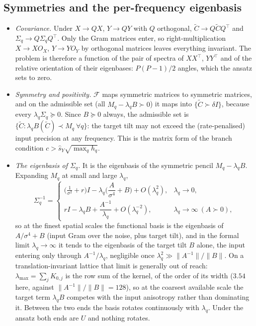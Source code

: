 \documentclass[11pt,a4paper]{article}
\newcommand{\Ct}{\tilde C}
\begin{document}
\subsection{Symmetries and the per-frequency eigenbasis}
\begin{itemize}
  \item \emph{Covariance.} Under $X \to QX$, $Y \to QY$ with $Q$ orthogonal, $\Ct \to Q\Ct Q^\top$ and $\Sigma_q \to Q\Sigma_q Q^\top$. Only the Gram matrices enter, so right-multiplication $X \to X O_X$, $Y \to Y O_Y$ by orthogonal matrices leaves everything invariant. The problem is therefore a function of the pair of spectra of $XX^\top$, $YY^\top$ and of the relative orientation of their eigenbases: $P(P-1)/2$ angles, which the ansatz sets to zero.
  \item \emph{Symmetry and positivity.} $\mathcal F$ maps symmetric matrices to symmetric matrices, and on the admissible set (all $M_q - \lambda_q B \succ 0$) it maps into $\{\Ct \succ \delta I\}$, because every $\lambda_q\Sigma_q \succeq 0$. Since $B \succeq 0$ always, the admissible set is $\{\Ct : \lambda_q B(\Ct) \prec M_q\ \forall q\}$: the target tilt may not exceed the (rate-penalised) input precision at any frequency. This is the matrix form of the branch condition $c > \hat s_Y\sqrt{\max_q h_q}$.
  \item \emph{The eigenbasis of $\Sigma_q$.} It is the eigenbasis of the symmetric pencil $M_q - \lambda_q B$. Expanding $M_q$ at small and large $\lambda_q$,
  \begin{equation}
    \Sigma_q^{-1} =
    \begin{cases}
      \big(\tfrac1{\sigma^2} + r\big) I - \lambda_q\Big(\dfrac{A}{\sigma^4} + B\Big) + O(\lambda_q^2), & \lambda_q \to 0,\\[2ex]
      r I - \lambda_q B + \dfrac{A^{-1}}{\lambda_q} + O(\lambda_q^{-2}), & \lambda_q \to \infty\ (A \succ 0),
    \end{cases}
    \label{eq:limits}
  \end{equation}
  so at the finest spatial scales the functional basis is the eigenbasis of $A/\sigma^4 + B$ (input Gram over the noise, plus target tilt), and in the formal limit $\lambda_q\to\infty$ it tends to the eigenbasis of the target tilt $B$ alone, the input entering only through $A^{-1}/\lambda_q$, negligible once $\lambda_q^2 \gg \|A^{-1}\|/\|B\|$. On a translation-invariant lattice that limit is generally out of reach: $\lambda_{\max} = \sum_j K_{0,j}$ is the row sum of the kernel, of the order of its width ($3.54$ here, against $\|A^{-1}\|/\|B\| = 128$), so at the coarsest available scale the target term $\lambda_q B$ competes with the input anisotropy rather than dominating it. Between the two ends the basis rotates continuously with $\lambda_q$. Under the ansatz both ends are $U$ and nothing rotates.
\end{itemize}
\end{document}
